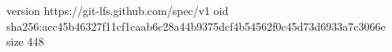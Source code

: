 version https://git-lfs.github.com/spec/v1
oid sha256:acc45b46327f11cf1caab6c28a44b9375dcf4b54562f0c45d73d6933a7c3066e
size 448
